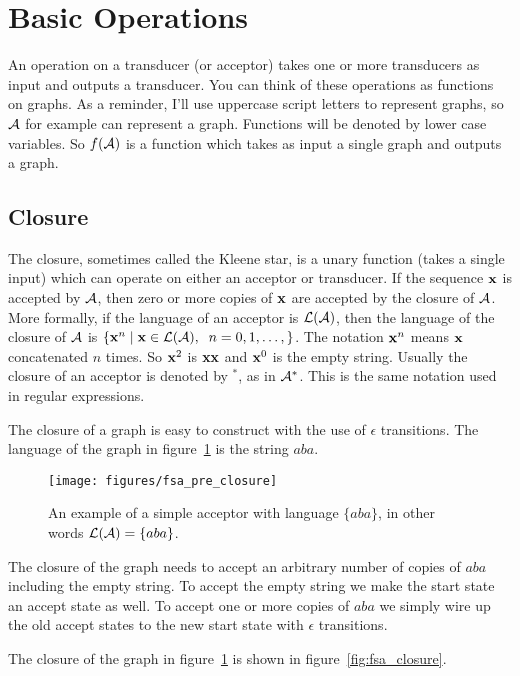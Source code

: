 \section{Basic Operations}
\label{sec:basic_operations}

An operation on a transducer (or acceptor) takes one or more transducers as
input and outputs a transducer. You can think of these operations as functions
on graphs. As a reminder, I'll use uppercase script letters to represent
graphs, so $\mathcal{A}$ for example can represent a graph. Functions will be denoted
by lower case variables. So $f(\mathcal{A})$ is a function which takes as input a
single graph and outputs a graph.

\subsection{Closure}

The closure, sometimes called the Kleene star, is a unary function (takes a
single input) which can operate on either an acceptor or transducer. If the
sequence ${\bf x}$ is accepted by $\mathcal{A}$, then zero or more copies of ${\bf x}$ are
accepted by the closure of $\mathcal{A}$. More formally, if the language of an acceptor
is $\mathcal{L}(\mathcal{A})$, then the language of the closure of $\mathcal{A}$ is $\{{\bf x}^n
\mid {\bf x} \in \mathcal{L}(\mathcal{A}),\;\; n = 0, 1, \ldots, \}$. The notation ${\bf x}^n$
means ${\bf x}$ concatenated $n$ times. So ${\bf x}^2$ is ${\bf x} {\bf x}$ and ${\bf x}^0$ is the
empty string. Usually the closure of an acceptor is denoted by $^*$, as in
$\mathcal{A}^*$. This is the same notation used in regular expressions.

The closure of a graph is easy to construct with the use of $\epsilon$
transitions. The language of the graph in figure~\ref{fig:fsa_pre_closure} is
the string $aba$.

\begin{figure}
    \centering
    \texttt{[image: figures/fsa\_pre\_closure]}
    \caption{An example of a simple acceptor with language $\{aba\}$, in other
    words $\mathcal{L}(\mathcal{A}) = \{aba\}$.}
    \label{fig:fsa_pre_closure}
\end{figure}

The closure of the graph needs to accept an arbitrary number of copies of $aba$
including the empty string. To accept the empty string we make the start state
an accept state as well. To accept one or more copies of $aba$ we simply wire
up the old accept states to the new start state with $\epsilon$ transitions.

The closure of the graph in figure~\ref{fig:fsa_pre_closure} is shown in
figure~\ref{fig:fsa_closure}.

